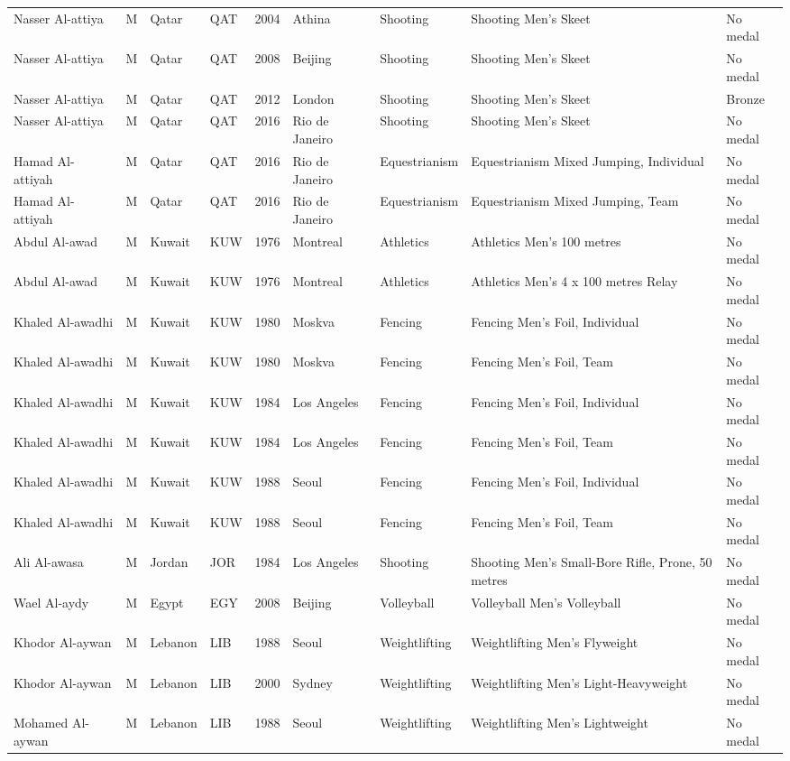 \documentclass{article}%
\begin{document}
\begin{longtable}{l l l l l l l l l}
Nasser Al{-}attiya&M&Qatar&QAT&2004&Athina&Shooting&Shooting Men's Skeet&No medal\\%
Nasser Al{-}attiya&M&Qatar&QAT&2008&Beijing&Shooting&Shooting Men's Skeet&No medal\\%
Nasser Al{-}attiya&M&Qatar&QAT&2012&London&Shooting&Shooting Men's Skeet&Bronze\\%
Nasser Al{-}attiya&M&Qatar&QAT&2016&Rio de Janeiro&Shooting&Shooting Men's Skeet&No medal\\%
Hamad Al{-}attiyah&M&Qatar&QAT&2016&Rio de Janeiro&Equestrianism&Equestrianism Mixed Jumping, Individual&No medal\\%
Hamad Al{-}attiyah&M&Qatar&QAT&2016&Rio de Janeiro&Equestrianism&Equestrianism Mixed Jumping, Team&No medal\\%
Abdul Al{-}awad&M&Kuwait&KUW&1976&Montreal&Athletics&Athletics Men's 100 metres&No medal\\%
Abdul Al{-}awad&M&Kuwait&KUW&1976&Montreal&Athletics&Athletics Men's 4 x 100 metres Relay&No medal\\%
Khaled Al{-}awadhi&M&Kuwait&KUW&1980&Moskva&Fencing&Fencing Men's Foil, Individual&No medal\\%
Khaled Al{-}awadhi&M&Kuwait&KUW&1980&Moskva&Fencing&Fencing Men's Foil, Team&No medal\\%
Khaled Al{-}awadhi&M&Kuwait&KUW&1984&Los Angeles&Fencing&Fencing Men's Foil, Individual&No medal\\%
Khaled Al{-}awadhi&M&Kuwait&KUW&1984&Los Angeles&Fencing&Fencing Men's Foil, Team&No medal\\%
Khaled Al{-}awadhi&M&Kuwait&KUW&1988&Seoul&Fencing&Fencing Men's Foil, Individual&No medal\\%
Khaled Al{-}awadhi&M&Kuwait&KUW&1988&Seoul&Fencing&Fencing Men's Foil, Team&No medal\\%
Ali Al{-}awasa&M&Jordan&JOR&1984&Los Angeles&Shooting&Shooting Men's Small{-}Bore Rifle, Prone, 50 metres&No medal\\%
Wael Al{-}aydy&M&Egypt&EGY&2008&Beijing&Volleyball&Volleyball Men's Volleyball&No medal\\%
Khodor Al{-}aywan&M&Lebanon&LIB&1988&Seoul&Weightlifting&Weightlifting Men's Flyweight&No medal\\%
Khodor Al{-}aywan&M&Lebanon&LIB&2000&Sydney&Weightlifting&Weightlifting Men's Light{-}Heavyweight&No medal\\%
Mohamed Al{-}aywan&M&Lebanon&LIB&1988&Seoul&Weightlifting&Weightlifting Men's Lightweight&No medal\\%

\end{longtable}
\end{document}
